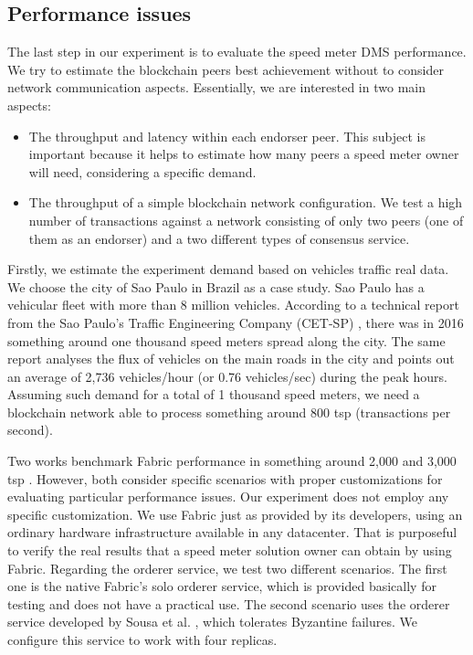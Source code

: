 \documentclass[journal]{IEEEtran}
\begin{document}
\subsection{Performance issues}
The last step in our experiment is to evaluate the speed meter DMS performance.
We try to estimate the blockchain peers best achievement without to consider network communication aspects.
Essentially, we are interested in two main aspects:
\begin{itemize}
   \item{The throughput and latency within each endorser peer. This subject is important because it helps to estimate how many peers a speed meter owner will need, considering a specific demand.}
   \item{The throughput of a simple blockchain network configuration. We test a high number of transactions against a network consisting of only two peers (one of them as an endorser) and a two different types of consensus service.}
\end{itemize}

Firstly, we estimate the experiment demand based on vehicles traffic real data.
We choose the city of Sao Paulo in Brazil as a case study.
Sao Paulo has a vehicular fleet with more than 8 million vehicles.
According to a technical report from the Sao Paulo's Traffic Engineering Company 
(CET-SP) \cite{CompanhiadeEngenhariadeTrafego-CET2017}, there was in 2016 something around one thousand speed meters spread along the city.
The same report analyses the flux of vehicles on the main roads in the city and points out an average of 2,736 vehicles/hour (or 0.76 vehicles/sec) during the peak hours.
Assuming such demand for a total of 1 thousand speed meters, we need a blockchain network able to process something around 800 tsp (transactions per second).

Two works benchmark Fabric performance in something around 2,000 and 3,000 tsp \cite{Androulaki2018}.
However, both consider specific scenarios with proper customizations for evaluating particular performance issues.
Our experiment does not employ any specific customization.
We use Fabric just as provided by its developers, using an ordinary hardware infrastructure available in any datacenter.
That is purposeful to verify the real results that a speed meter solution owner can obtain by using Fabric.
Regarding the orderer service, we test two different scenarios.
The first one is the native Fabric's solo orderer service, which is provided basically for testing and does not have a practical use.
The second scenario uses the orderer service developed by Sousa et al. \cite{Sousa2018}, which tolerates Byzantine failures.
We configure this service to work with four replicas.
\end{document}
